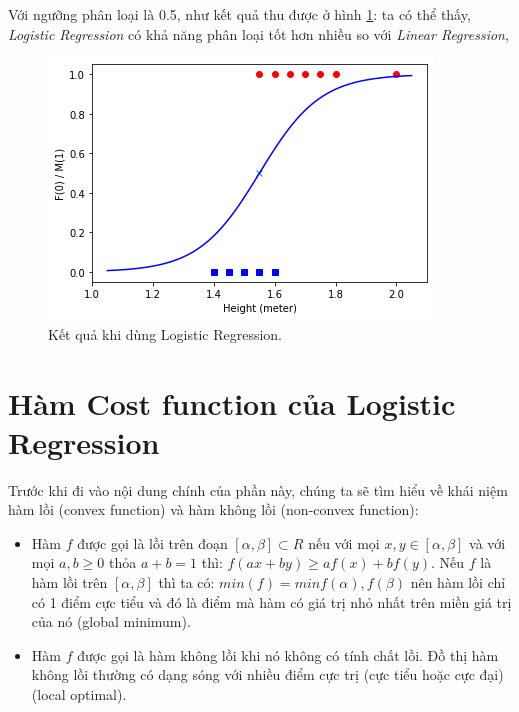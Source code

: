 Với ngưỡng phân loại là 0.5, như  kết quả thu được ở hình \ref{fig:lg_result}: ta có thể thấy, \textit{Logistic Regression} có khả năng phân loại tốt hơn nhiều so với \textit{Linear Regression},

\begin{figure}[!ht]
    \centering
    \includegraphics[scale=0.8]{books/artificial-neural-network/chapter02/figure/LG_result.png}
    \caption{Kết quả khi dùng Logistic Regression.}
    \label{fig:lg_result}
\end{figure}

\section{Hàm Cost function của Logistic Regression}
Trước khi đi vào nội dung chính của phần này, chúng ta sẽ tìm hiểu về khái niệm hàm lồi (convex function) và hàm không lồi (non-convex function):

\begin{itemize}
    \item Hàm $f$ được gọi là lồi trên đoạn $[\alpha, \beta] \subset R$ nếu với mọi $x,y \in [\alpha, \beta]$ và với mọi $a, b \geq 0$ thỏa $a + b = 1$ thì: $f(ax + by) \geq af(x) + bf(y)$. Nếu $f$ là hàm lồi trên $[\alpha, \beta]$ thì ta có: $min(f)=min{f(\alpha), f(\beta)}$ nên hàm lồi chỉ có 1 điểm cực tiểu và đó là điểm mà hàm có giá trị nhỏ nhất trên miền giá trị của nó (global minimum).
    \item Hàm $f$ được gọi là hàm không lồi khi nó không có tính chất lồi. Đồ thị hàm không lồi thường có dạng sóng với nhiều điểm cực trị (cực tiểu hoặc cực đại) (local optimal).
\end{itemize}

